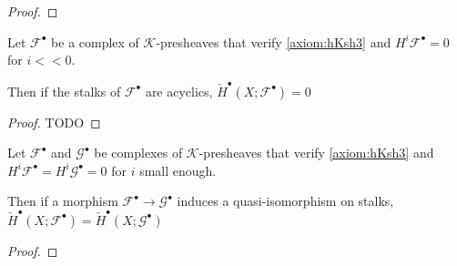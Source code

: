 \begin{proof}
\end{proof}

\begin{lemma}\label{lem:chech_is_determined_by_stalks_2}
    Let $\mathcal{F}^{\bullet}$ be a complex of $\mathcal{K}$-presheaves that verify \eqref{axiom:hKsh3} and $H^i\mathcal{F}^{\bullet}=0$ for $i<<0$.
    
    Then if the stalks of $\mathcal{F}^{\bullet}$ are acyclics, $\check{H}^{\bullet}(X;\mathcal{F}^{\bullet})=0$

\end{lemma}

\begin{proof}
    TODO
\end{proof}


\begin{proposition}\label{prop:chech_is_determined_by_stalks_3}
    Let $\mathcal{F}^{\bullet}$ and $\mathcal{G}^{\bullet}$ be complexes of $\mathcal{K}$-presheaves that verify \eqref{axiom:hKsh3} and $H^i\mathcal{F}^{\bullet}=H^i\mathcal{G}^{\bullet}=0$ for $i$ small enough.
    
    Then if a morphism $\mathcal{F}^{\bullet}\to \mathcal{G}^{\bullet}$ induces a quasi-isomorphism on stalks, $\check{H}^{\bullet}(X;\mathcal{F}^{\bullet})=\check{H}^{\bullet}(X;\mathcal{G}^{\bullet})$
\end{proposition}

\begin{proof}
\end{proof}